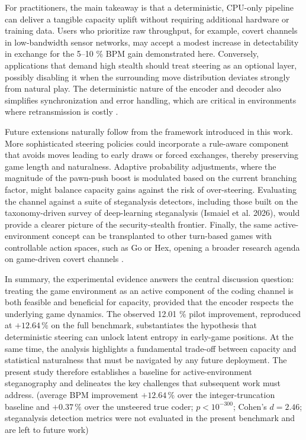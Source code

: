 \documentclass[journal]{IEEEtran}
\begin{document}
For practitioners, the main takeaway is that a deterministic, CPU-only pipeline can deliver a tangible capacity uplift without requiring additional hardware or training data. Users who prioritize raw throughput, for example, covert channels in low-bandwidth sensor networks, may accept a modest increase in detectability in exchange for the 5--10 \% BPM gain demonstrated here. Conversely, applications that demand high stealth should treat steering as an optional layer, possibly disabling it when the surrounding move distribution deviates strongly from natural play. The deterministic nature of the encoder and decoder also simplifies synchronization and error handling, which are critical in environments where retransmission is costly \cite{yan2026comprehensives}.

Future extensions naturally follow from the framework introduced in this work. More sophisticated steering policies could incorporate a rule-aware component that avoids moves leading to early draws or forced exchanges, thereby preserving game length and naturalness. Adaptive probability adjustments, where the magnitude of the pawn-push boost is modulated based on the current branching factor, might balance capacity gains against the risk of over-steering. Evaluating the channel against a suite of steganalysis detectors, including those built on the taxonomy-driven survey of deep-learning steganalysis (Ismaiel et al. 2026), would provide a clearer picture of the security-stealth frontier. Finally, the same active-environment concept can be transplanted to other turn-based games with controllable action spaces, such as Go or Hex, opening a broader research agenda on game-driven covert channels \cite{ruoss2024amortizedplann, ismaiel2026taxonomydriven}.

In summary, the experimental evidence answers the central discussion question: treating the game environment as an active component of the coding channel is both feasible and beneficial for capacity, provided that the encoder respects the underlying game dynamics. The observed 12.01 \% pilot improvement, reproduced at $+12.64\,\%$ on the full benchmark, substantiates the hypothesis that deterministic steering can unlock latent entropy in early-game positions. At the same time, the analysis highlights a fundamental trade-off between capacity and statistical naturalness that must be navigated by any future deployment. The present study therefore establishes a baseline for active-environment steganography and delineates the key challenges that subsequent work must address. (average BPM improvement $+12.64\,\%$ over the integer-truncation baseline and $+0.37\,\%$ over the unsteered true coder; $p < 10^{-300}$; Cohen's $d = 2.46$; steganalysis detection metrics were not evaluated in the present benchmark and are left to future work)
\end{document}
